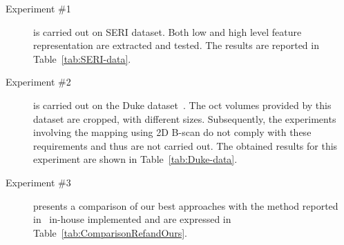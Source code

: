 \begin{description}

\item[Experiment \#1] is carried out on SERI dataset. Both low and high level feature representation are extracted and tested. The results are reported in Table~\ref{tab:SERI-data}.

\item[Experiment \#2] is carried out on the Duke dataset~\cite{Srinivasan2014}. The \ac{oct} volumes provided by this dataset are cropped, with different sizes.
Subsequently, the experiments involving the mapping using 2D B-scan do not comply with these requirements and thus are not carried out.
The obtained results for this experiment are shown in Table~\ref{tab:Duke-data}.

\item[Experiment \#3] presents a comparison of our best approaches with the method reported in~\cite{Venhuizen2015} in-house implemented and are expressed in Table~\ref{tab:ComparisonRefandOurs}.

\end{description}


